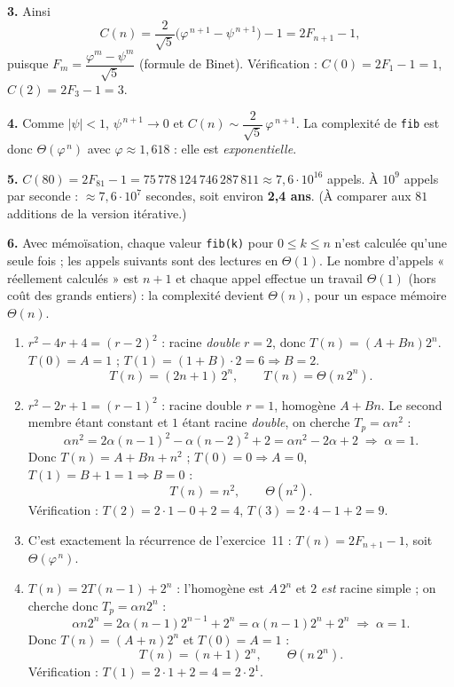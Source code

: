 \documentclass[11pt,a4paper]{article}
\begin{document}
\textbf{3.} Ainsi
\[
  C(n) = \frac{2}{\sqrt5}\big(\varphi^{\,n+1}-\psi^{\,n+1}\big)-1 = 2F_{n+1}-1,
\]
puisque $F_m = \dfrac{\varphi^{m}-\psi^{m}}{\sqrt5}$ (formule de Binet).
Vérification : $C(0)=2F_1-1=1$, $C(2)=2F_3-1=3$. \checkmark

\textbf{4.} Comme $|\psi|<1$, $\psi^{\,n+1}\to0$ et
$C(n)\sim \dfrac{2}{\sqrt5}\,\varphi^{\,n+1}$.
La complexité de \texttt{fib} est donc $\Theta(\varphi^{\,n})$ avec
$\varphi\approx1{,}618$ : elle est \emph{exponentielle}.

\textbf{5.} $C(80)=2F_{81}-1 = 75\,778\,124\,746\,287\,811 \approx 7{,}6\cdot10^{16}$
appels. À $10^{9}$ appels par seconde : $\approx 7{,}6\cdot10^{7}$ secondes,
soit environ \textbf{2,4 ans}. (À comparer aux $81$ additions de la version itérative.)

\textbf{6.} Avec mémoïsation, chaque valeur \texttt{fib(k)} pour $0\le k\le n$ n'est
calculée qu'une seule fois ; les appels suivants sont des lectures en $\Theta(1)$.
Le nombre d'appels « réellement calculés » est $n+1$ et chaque appel effectue un travail
$\Theta(1)$ (hors coût des grands entiers) : la complexité devient $\Theta(n)$, pour un
espace mémoire $\Theta(n)$.

\reponse
\begin{enumerate}[label=(\alph*),leftmargin=*,itemsep=6pt]
  \item $r^2-4r+4=(r-2)^2$ : racine \emph{double} $r=2$, donc
        $T(n)=(A+Bn)2^{n}$. $T(0)=A=1$ ; $T(1)=(1+B)\cdot2=6\Rightarrow B=2$.
        \[\boxed{T(n)=(2n+1)\,2^{n}} ,\qquad T(n)=\Theta(n\,2^{n}).\]

  \item $r^2-2r+1=(r-1)^2$ : racine double $r=1$, homogène $A+Bn$.
        Le second membre étant constant et $1$ étant racine \emph{double}, on cherche
        $T_p=\alpha n^{2}$ :
        \[
          \alpha n^2 = 2\alpha(n-1)^2-\alpha(n-2)^2+2 = \alpha n^2 -2\alpha+2
          \;\Longrightarrow\; \alpha=1 .
        \]
        Donc $T(n)=A+Bn+n^2$ ; $T(0)=0\Rightarrow A=0$, $T(1)=B+1=1\Rightarrow B=0$ :
        \[\boxed{T(n)=n^{2}},\qquad \Theta(n^2).\]
        Vérification : $T(2)=2\cdot1-0+2=4$, $T(3)=2\cdot4-1+2=9$. \checkmark

  \item C'est exactement la récurrence de l'exercice~11 :
        $\boxed{T(n)=2F_{n+1}-1}$, soit $\Theta(\varphi^{\,n})$.

  \item $T(n)=2T(n-1)+2^{n}$ : l'homogène est $A\,2^{n}$ et $2$ \emph{est} racine simple ;
        on cherche donc $T_p=\alpha n 2^{n}$ :
        \[
          \alpha n 2^{n} = 2\alpha(n-1)2^{n-1}+2^{n} = \alpha(n-1)2^{n}+2^{n}
          \;\Longrightarrow\; \alpha = 1 .
        \]
        Donc $T(n)=(A+n)2^{n}$ et $T(0)=A=1$ :
        \[\boxed{T(n)=(n+1)\,2^{n}},\qquad \Theta(n\,2^{n}).\]
        Vérification : $T(1)=2\cdot1+2=4=2\cdot2^{1}$. \checkmark
\end{enumerate}
\end{document}
